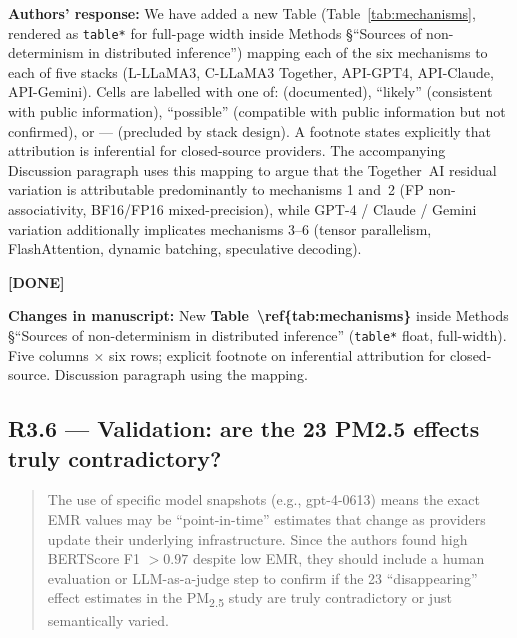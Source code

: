 \documentclass[11pt,a4paper]{article}
\newenvironment{revquote}{%
  \begin{quote}\small\itshape\color{revgray}
}{%
  \end{quote}
}
\newcommand{\response}[1]{\par\noindent\textbf{\color{revgreen}Authors' response:} #1\par}
\newcommand{\changes}[1]{\par\noindent\textbf{\color{revblue}Changes in manuscript:} #1\par}
\newcommand{\done}{\color{revgreen}\textbf{[DONE]}}
\begin{document}
\response{We have added a new Table (Table~\ref{tab:mechanisms}, rendered as \texttt{table*} for full-page width inside Methods §``Sources of non-determinism in distributed inference'') mapping each of the six mechanisms to each of five stacks (L-LLaMA3, C-LLaMA3 Together, API-GPT4, API-Claude, API-Gemini). Cells are labelled with one of: \checkmark (documented), ``likely'' (consistent with public information), ``possible'' (compatible with public information but not confirmed), or --- (precluded by stack design). A footnote states explicitly that attribution is inferential for closed-source providers. The accompanying Discussion paragraph uses this mapping to argue that the Together~AI residual variation is attributable predominantly to mechanisms 1 and~2 (FP non-associativity, BF16/FP16 mixed-precision), while GPT-4 / Claude / Gemini variation additionally implicates mechanisms 3--6 (tensor parallelism, FlashAttention, dynamic batching, speculative decoding).} \done

\changes{New \textbf{Table~\textbackslash ref\{tab:mechanisms\}} inside Methods §``Sources of non-determinism in distributed inference'' (\texttt{table*} float, full-width). Five columns × six rows; explicit footnote on inferential attribution for closed-source. Discussion paragraph using the mapping.}

\subsection*{R3.6 --- Validation: are the 23 PM2.5 effects truly contradictory?}

\begin{revquote}
The use of specific model snapshots (e.g., gpt-4-0613) means the exact EMR values may be ``point-in-time'' estimates that change as providers update their underlying infrastructure. Since the authors found high BERTScore F1 $>0.97$ despite low EMR, they should include a human evaluation or LLM-as-a-judge step to confirm if the 23 ``disappearing'' effect estimates in the PM\textsubscript{2.5} study are truly contradictory or just semantically varied.
\end{revquote}
\end{document}

